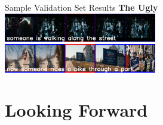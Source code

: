 \documentclass{beamer}
\begin{document}
\begin{frame}{Sample Validation Set Results}
    \textbf{The Ugly}\\[2mm]
    \includegraphics[width=0.5\textwidth]{images/110510496_genCap.png}\hspace*{0.01\textwidth} \includegraphics[width=0.5\textwidth]{images/140770020_genCap.png}\\
\end{frame}
\section{Looking Forward}


\end{document}
